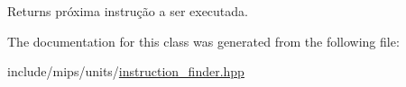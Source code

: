 \begin{DoxyReturn}{Returns}
próxima instrução a ser executada. 
\end{DoxyReturn}


The documentation for this class was generated from the following file\+:\begin{DoxyCompactItemize}
\item 
include/mips/units/\hyperlink{instruction__finder_8hpp}{instruction\+\_\+finder.\+hpp}\end{DoxyCompactItemize}
